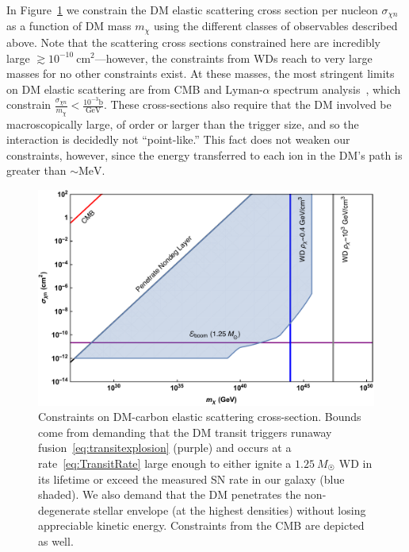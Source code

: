 \documentclass[preprintnumbers,amsmath,amssymb,prd,superscriptaddress]{revtex4}
\newcommand{\GeV}{\text{GeV}}
\newcommand{\cm}{\text{cm}}
\begin{document}
In Figure~\ref{fig:transit-elastic} we constrain the DM elastic scattering cross section per nucleon $\sigma_{\chi n}$ as a function of DM mass $m_\chi$ using the different classes of observables described above.
Note that the scattering cross sections constrained here are incredibly large $\gtrsim 10^{-10} ~\cm^2$---however, the constraints from WDs reach to very large masses for no other constraints exist.
At these masses, the most stringent limits on DM elastic scattering are from CMB and Lyman-$\alpha$ spectrum analysis~\cite{Dvorkin:2013cea}, which constrain $\frac{\sigma_{\chi n}}{m_\chi} < \frac{10^{-3} \text{b}}{\GeV}$. 
These cross-sections also require that the DM involved be macroscopically large, of order or larger than the trigger size, and so the interaction is decidedly not ``point-like.''
This fact does not weaken our constraints, however, since the energy transferred to each ion in the DM's path is greater than $\sim \text{MeV}$.

\begin{figure}
\includegraphics[scale=.45]{transitobservation.pdf}
\caption{Constraints on DM-carbon elastic scattering cross-section.
Bounds come from demanding that the DM transit triggers runaway fusion~\eqref{eq:transitexplosion} (purple) and occurs at a rate~\eqref{eq:TransitRate} large enough to either ignite a $1.25~M_{\astrosun}$ WD in its lifetime or exceed the measured SN rate in our galaxy (blue shaded).
We also demand that the DM penetrates the non-degenerate stellar envelope (at the highest densities) without losing appreciable kinetic energy.
Constraints from the CMB \cite{Dvorkin:2013cea} are depicted as well. 
}
\label{fig:transit-elastic}
\end{figure}
\end{document}
